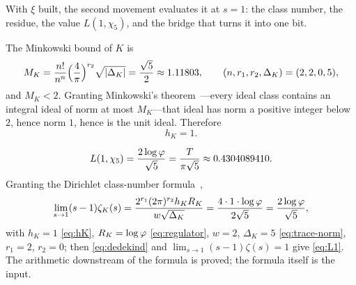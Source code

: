 With $\xi$ built, the second movement evaluates it at $s=1$: the class number, the residue, the
value $L(1,\chi_5)$, and the bridge that turns it into one bit.

\begin{proposition}\label{prop:class-number}
The Minkowski bound of $K$ is
\begin{equation}\label{eq:minkowski}
  M_K=\frac{n!}{n^{n}}\Bigl(\frac{4}{\pi}\Bigr)^{r_2}\sqrt{|\Delta_K|}=\frac{\sqrt5}{2}\approx1.11803,
  \qquad (n,r_1,r_2,\Delta_K)=(2,2,0,5),
\end{equation}
and $M_K<2$. Granting Minkowski's theorem~\cite{Minkowski1896}---every ideal class contains an integral ideal of norm
at most $M_K$---that ideal has norm a positive integer below $2$, hence norm $1$, hence is the
unit ideal. Therefore
\begin{equation}\label{eq:hK}
  h_K=1 .
\end{equation}

\end{proposition}

\begin{theorem}\label{thm:L1}
\begin{equation}\label{eq:L1}
  L(1,\chi_5)=\frac{2\log\varphi}{\sqrt5}=\frac{T}{\pi\sqrt5}\approx0.4304089410 .
\end{equation}
Granting the Dirichlet class-number formula~\cite{dirichlet},
\begin{equation}\label{eq:cnf}
  \lim_{s\to1}(s-1)\zeta_K(s)=\frac{2^{r_1}(2\pi)^{r_2}h_KR_K}{w\sqrt{\Delta_K}}
  =\frac{4\cdot1\cdot\log\varphi}{2\sqrt5}=\frac{2\log\varphi}{\sqrt5},
\end{equation}
with $h_K=1$ \eqref{eq:hK}, $R_K=\log\varphi$ \eqref{eq:regulator}, $w=2$, $\Delta_K=5$
\eqref{eq:trace-norm}, $r_1=2$, $r_2=0$; then \eqref{eq:dedekind} and
$\lim_{s\to1}(s-1)\zeta(s)=1$ give \eqref{eq:L1}. The arithmetic downstream of the formula is
proved; the formula itself is the input.

%
\end{theorem}

